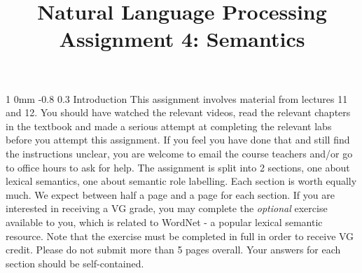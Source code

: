 \documentclass[11pt]{article}
\title{{\LARGE Natural Language Processing}\\[1.5mm]{\large Assignment 4: Semantics}}
\author{}
\date{} %
\makeatletter
\renewcommand{\section}{\@startsection
{section}%
{1}%
{0mm}%
{-0.8\baselineskip}%
{0.3\baselineskip}%
{\bfseries\large}}%
\makeatother
\begin{document}
 


\maketitle
\section{Introduction}
\noindent This assignment involves material from lectures 11 and 12. You should
have watched the relevant videos, read the relevant chapters in the textbook and
made a serious attempt at completing the relevant labs before you attempt this
assignment. If you feel you have done that and still find the instructions
unclear, you are welcome to email the course teachers and/or go to office hours
to ask for help. The assignment is split into 2 sections, one about lexical
semantics, one about semantic role labelling. Each section is worth equally
much. We expect between half a page and a page for each section. If you are
interested in receiving a VG grade, you may complete the \textit{optional}
exercise available to you, which is related to WordNet - a popular lexical
semantic resource. Note that the exercise must be completed in full in order to
receive VG credit. Please do not submit more than 5 pages overall. Your answers
for each section should be self-contained.
\end{document}
